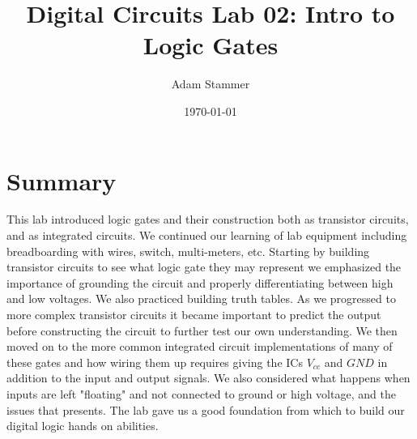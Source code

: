 \documentclass[prb,preprint]{revtex4-1}
\begin{document}
\title{Digital Circuits Lab 02: Intro to Logic Gates}
\author{Adam Stammer}

\date{\today}


\maketitle

\section{Summary}
This lab introduced logic gates and their construction both as transistor circuits, and as integrated circuits. We continued our learning of lab equipment including breadboarding with wires, switch, multi-meters, etc. Starting by building transistor circuits to see what logic gate they may represent we emphasized the importance of grounding the circuit and properly differentiating between high and low voltages. We also practiced building truth tables. As we progressed to more complex transistor circuits it became important to predict the output before constructing the circuit to further test our own understanding. We then moved on to the more common integrated circuit implementations of many of these gates and how wiring them up requires giving the ICs $V_{cc}$ and $GND$ in addition to the input and output signals. We also considered what happens when inputs are left "floating" and not connected to ground or high voltage, and the issues that presents. The lab gave us a good foundation from which to build our digital logic hands on abilities.
\end{document}
